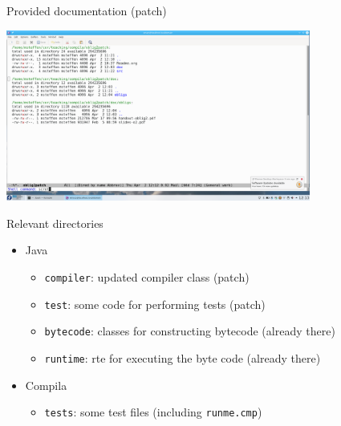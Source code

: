 \documentclass{beamer}
\begin{document}
\begin{frame}[label={sec:orgffa9185}]{Provided documentation (patch)}

\begin{center}
 \includegraphics[width=0.75\textwidth]{figures/snaps/directorystructure-doc}
\end{center}
\end{frame}



\begin{frame}[label={sec:org27050c3},fragile]{Relevant directories}
 \begin{itemize}
\item Java

\begin{itemize}
\item \texttt{compiler}: updated compiler class (patch)
\item \texttt{test}:   some code for performing tests (patch)
\item \texttt{bytecode}: classes for constructing bytecode (already there)
\item \texttt{runtime}: rte for executing the byte code (already there)
\end{itemize}

\item Compila

\begin{itemize}
\item \texttt{tests}: some test files (including \texttt{runme.cmp})
\end{itemize}
\end{itemize}
\end{frame}
\end{document}
